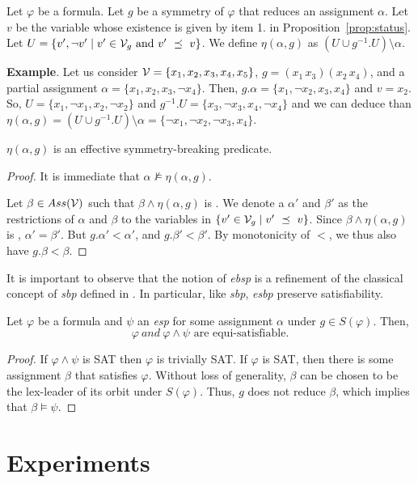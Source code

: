 \begin{definition}
	\label{def:eta}
	Let $\varphi$ be a formula.
	Let $g$ be a symmetry of $\varphi$ that reduces an assignment $\alpha$.
	Let $v$ be the variable whose existence is given by item 1. in Proposition~\ref{prop:status}.
	Let $U = \{ v', \neg v' \mid v' \in \mathcal{V}_g \text{ and } v'~\preceq~v\}$.
	We define $\eta(\alpha, g)$ as $(U \cup g^{-1}.U) \setminus \alpha$.
\end{definition}

\textbf{Example}. Let us consider $\mathcal{V} = \{x_1, x_2, x_3, x_4, x_5\}$, $g =
(x_1\,x_3)(x_2\,x_4)$, and a partial assignment $\alpha = \{x_1, x_2,
x_3, \neg x_4\}$. Then, $g.\alpha = \{x_1, \neg x_2, x_3, x_4\}$ and $v = x_2$.
So, $U = \{x_1, \neg x_1, x_2, \neg x_2\}$ and $g^{-1}.U = \{x_3, \neg x_3,
x_4, \neg x_4\}$ and we can deduce than $\eta(\alpha, g) = (U \cup g^{-1}.U)
\setminus \alpha = \{\neg x_1, \neg x_2, \neg x_3, x_4\}$.

\begin{proposition}
	\label{prop:eta}
	$\eta(\alpha, g)$ is an effective symmetry-breaking predicate.
\end{proposition}
\begin{proof}
	It is immediate that $\alpha \not\models \eta(\alpha, g)$.
	
	Let $\beta \in Ass(\mathcal{V})$ such that $\beta \wedge \eta(\alpha, g)$ is \unsat. We denote a $\alpha'$
	and $\beta'$ as the restrictions of $\alpha$ and $\beta$ to the variables in $\{ v' \in
	\mathcal{V}_g \mid v'~\preceq~v \}$. Since $\beta \wedge \eta(\alpha, g)$ is \unsat, $\alpha' = \beta'$.
	But $g.\alpha' < \alpha'$, and $g.\beta' < \beta'$. By monotonicity of $<$, we thus also have
	$g.\beta < \beta$. \end{proof}

\medskip\noindent It is important to observe that the notion of \textit{ebsp}
is a refinement of the classical concept of \textit{sbp} defined in
\cite{aloul06}. In particular, like \textit{sbp}, \textit{esbp} preserve
satisfiability.

\begin{theorem}
	Let $\varphi$ be a formula and $\psi$ an \textit{esp} for some assignment $\alpha$ under $g \in S(\varphi)$. Then,
	$$\varphi~and ~\varphi \wedge \psi \text{ are equi-satisfiable}.$$
\end{theorem}

\begin{proof}
	
	If $\varphi \wedge \psi$ is SAT then $\varphi$ is trivially SAT. If
	$\varphi$ is SAT, then there is some assignment $\beta$ that satisfies $\varphi$.
	Without loss of generality, $\beta$ can be chosen to be the lex-leader of its
	orbit under $S(\varphi)$. Thus, $g$ does not reduce $\beta$, which implies that
	$\beta \models \psi$.
	
\end{proof}


\section{Experiments}
